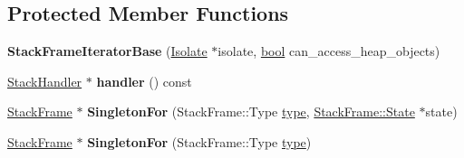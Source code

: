 \subsection*{Protected Member Functions}
\begin{DoxyCompactItemize}
\item 
\mbox{\label{classv8_1_1internal_1_1StackFrameIteratorBase_a015afc3da9f03122edcf16d83e380ff8}} 
{\bfseries Stack\+Frame\+Iterator\+Base} (\mbox{\hyperlink{classv8_1_1internal_1_1Isolate}{Isolate}} $\ast$isolate, \mbox{\hyperlink{classbool}{bool}} can\+\_\+access\+\_\+heap\+\_\+objects)
\item 
\mbox{\label{classv8_1_1internal_1_1StackFrameIteratorBase_a647257f2f2ceaddf28583d197e0b9c5a}} 
\mbox{\hyperlink{classv8_1_1internal_1_1StackHandler}{Stack\+Handler}} $\ast$ {\bfseries handler} () const
\item 
\mbox{\label{classv8_1_1internal_1_1StackFrameIteratorBase_ac939af868ca0c26cf1bc83f8782d446c}} 
\mbox{\hyperlink{classv8_1_1internal_1_1StackFrame}{Stack\+Frame}} $\ast$ {\bfseries Singleton\+For} (Stack\+Frame\+::\+Type \mbox{\hyperlink{classstd_1_1conditional_1_1type}{type}}, \mbox{\hyperlink{structv8_1_1internal_1_1StackFrame_1_1State}{Stack\+Frame\+::\+State}} $\ast$state)
\item 
\mbox{\label{classv8_1_1internal_1_1StackFrameIteratorBase_ab0340de6a84495ac0a5f280da564560e}} 
\mbox{\hyperlink{classv8_1_1internal_1_1StackFrame}{Stack\+Frame}} $\ast$ {\bfseries Singleton\+For} (Stack\+Frame\+::\+Type \mbox{\hyperlink{classstd_1_1conditional_1_1type}{type}})
\end{DoxyCompactItemize}
